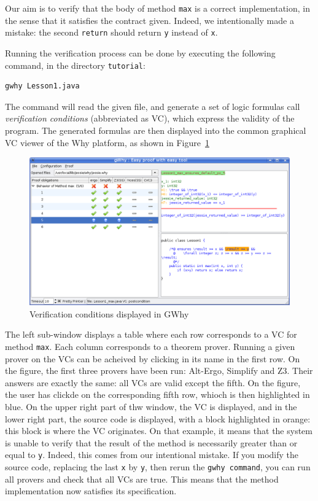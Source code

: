 \documentclass[a4paper,11pt,twoside,openright]{report}
\begin{document}
Our aim is to verify that the body of method \texttt{max} is a correct
implementation, in the sense that it satisfies the contract
given. Indeed, we intentionally made a mistake: the second
\texttt{return} should return \texttt{y} instead of \texttt{x}.

Running the verification process can be done by executing the
following command, in the directory \verb|tutorial|: 
\begin{verbatim}
gwhy Lesson1.java
\end{verbatim}
The command will read the given file, and generate a set of logic
formulas call \emph{verification conditions} (abbreviated as VC),
which express the validity of the program. The generated formulas are
then displayed into the common graphical VC viewer of the Why
platform, as shown in Figure~\ref{fig:gwhy}

\begin{figure}[t]
  \begin{center}
    \includegraphics[width=\textwidth]{Lesson1_max.png}
  \end{center}
  \caption{Verification conditions displayed in GWhy}
\label{fig:gwhy}
\hrulefill
\end{figure}

The left sub-window displays a table where each row corresponds to a
VC for method \texttt{max}. Each column corresponds to a theorem
prover. Running a given prover on the VCs can be acheived by clicking
in its name in the first row. On the figure, the first three provers
have been run: Alt-Ergo, Simplify and Z3. Their answers are exactly the
same: all VCs are valid except the fifth. On the figure, the user has
clickde on the corresponding fifth row, whioch is then highlighted in
blue. On the upper right part of thw window, the VC is displayed, and
in the lower right part, the source code is displayed, with a block
highlighted in orange: this block is where the VC originates. On that
example, it means that the system is unable to verify that the result
of the method is necessarily greater than or equal to
\texttt{y}. Indeed, this comes from our intentional mistake. If you
modify the source code, replacing the last \texttt{x} by \texttt{y},
then rerun the \texttt{gwhy command}, you can run all provers and
check that all VCs are true. This means that the method implementation
now satisfies its specification.
\end{document}
